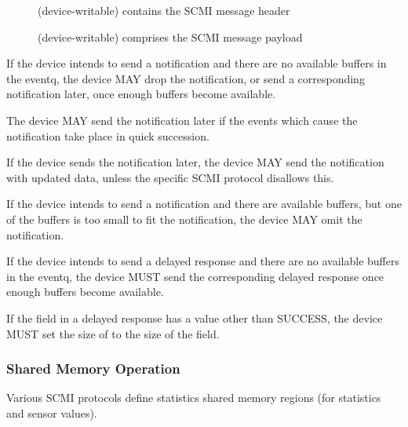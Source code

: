 \begin{description}
\item[] (device-writable) contains the SCMI message header
\item[] (device-writable) comprises the SCMI message
payload
\end{description}


If the device intends to send a notification and there are no available
buffers in the eventq, the device MAY drop the notification, or send a
corresponding notification later, once enough buffers become available.

The device MAY send the notification later if the events which cause the
notification take place in quick succession.

If the device sends the notification later, the device MAY send the
notification with updated data, unless the specific SCMI protocol
disallows this.

If the device intends to send a notification and there are available
buffers, but one of the buffers is too small to fit the notification,
the device MAY omit the notification.

If the device intends to send a delayed response and there are no
available buffers in the eventq, the device MUST send the corresponding
delayed response once enough buffers become available.

If the  field in a delayed response  has a
value other than SUCCESS, the device MUST set the size of
 to the size of the  field.

\subsubsection{Shared Memory Operation}

Various SCMI protocols define statistics shared memory regions (for
statistics and sensor values).


